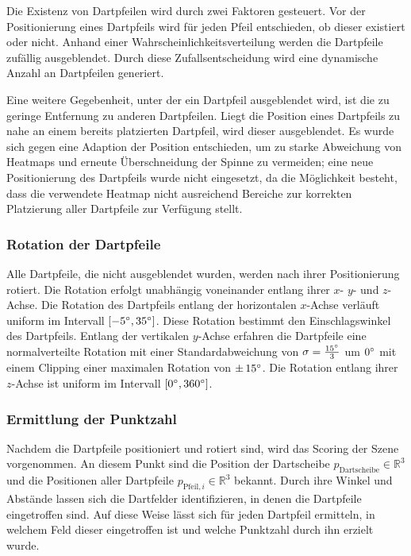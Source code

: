 Die Existenz von Dartpfeilen wird durch zwei Faktoren gesteuert. Vor der Positionierung eines Dartpfeils wird für jeden Pfeil entschieden, ob dieser existiert oder nicht. Anhand einer Wahrscheinlichkeitsverteilung werden die Dartpfeile zufällig ausgeblendet. Durch diese Zufallsentscheidung wird eine dynamische Anzahl an Dartpfeilen generiert.

Eine weitere Gegebenheit, unter der ein Dartpfeil ausgeblendet wird, ist die zu geringe Entfernung zu anderen Dartpfeilen. Liegt die Position eines Dartpfeils zu nahe an einem bereits platzierten Dartpfeil, wird dieser ausgeblendet. Es wurde sich gegen eine Adaption der Position entschieden, um zu starke Abweichung von Heatmaps und erneute Überschneidung der Spinne zu vermeiden; eine neue Positionierung des Dartpfeils wurde nicht eingesetzt, da die Möglichkeit besteht, dass die verwendete Heatmap nicht ausreichend Bereiche zur korrekten Platzierung aller Dartpfeile zur Verfügung stellt.

\subsubsection{Rotation der Dartpfeile}
\label{sec:dartpfeile_rotation}

Alle Dartpfeile, die nicht ausgeblendet wurden, werden nach ihrer Positionierung rotiert. Die Rotation erfolgt unabhängig voneinander entlang ihrer $x$- $y$- und $z$-Achse. Die Rotation des Dartpfeils entlang der horizontalen $x$-Achse verläuft uniform im Intervall $[-5^{\circ}, 35^{\circ}]$. Diese Rotation bestimmt den Einschlagswinkel des Dartpfeils. Entlang der vertikalen $y$-Achse erfahren die Dartpfeile eine normalverteilte Rotation mit einer Standardabweichung von $\sigma = \frac{15^{\circ}}{3}$ um $0^{\circ}$ mit einem Clipping einer maximalen Rotation von $\pm\,15^{\circ}$. Die Rotation entlang ihrer $z$-Achse ist uniform im Intervall $[0^{\circ}, 360^{\circ}]$.

\subsubsection{Ermittlung der Punktzahl}
\label{sec:dartpfeile_punktzahl}

Nachdem die Dartpfeile positioniert und rotiert sind, wird das Scoring der Szene vorgenommen. An diesem Punkt sind die Position der Dartscheibe $p_\text{Dartscheibe} \in \mathbb{R}^3$ und die Positionen aller Dartpfeile $p_{\text{Pfeil}, i} \in \mathbb{R}^3$ bekannt. Durch ihre Winkel und Abstände lassen sich die Dartfelder identifizieren, in denen die Dartpfeile eingetroffen sind. Auf diese Weise lässt sich für jeden Dartpfeil ermitteln, in welchem Feld dieser eingetroffen ist und welche Punktzahl durch ihn erzielt wurde.

